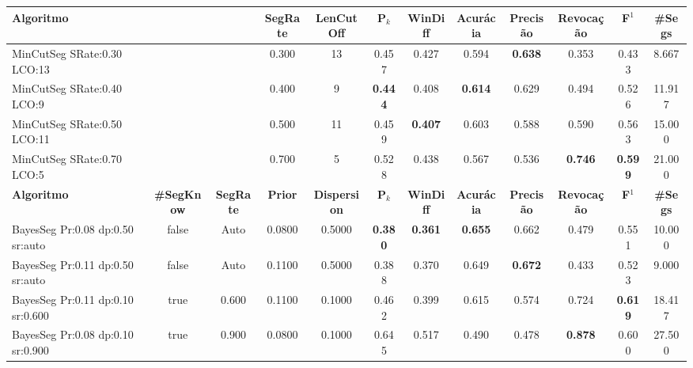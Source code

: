 \documentclass{article}
\begin{document}
\begin{table}[!h]
\begin{tabular}{|l||c|c|c|c|c|c|c|c|c|c|c|}
\hline
		\textbf{Algoritmo} &&& 
		\textbf{SegRate} &
		\textbf{LenCutOff} & 
		\textbf{P$_k$} & 
		\textbf{WinDiff} & 
		\textbf{Acurácia} & 
		\textbf{Precisão} & 
		\textbf{Revocação} &
		\textbf{F$^1$} &
		\textbf{\#Segs} \\	\hline


 MinCutSeg SRate:0.30 LCO:13 &&& 0.300 & 13 & 0.457 & 0.427 & 0.594 & \cellcolor{gray!20} \textbf{0.638} & 0.353 & 0.433 & 8.667  \\ \hline 

 MinCutSeg SRate:0.40 LCO:9 &&& 0.400 & 9 & \cellcolor{gray!20} \textbf{0.444} & 0.408 & \cellcolor{gray!20} \textbf{0.614} & 0.629 & 0.494 & 0.526 & 11.917  \\ \hline 

 MinCutSeg SRate:0.50 LCO:11 &&& 0.500 & 11 & 0.459 & \cellcolor{gray!20} \textbf{0.407} & 0.603 & 0.588 & 0.590 & 0.563 & 15.000  \\ \hline 

 MinCutSeg SRate:0.70 LCO:5 &&& 0.700 & 5 & 0.528 & 0.438 & 0.567 & 0.536 & \cellcolor{gray!20} \textbf{0.746} & \cellcolor{gray!20} \textbf{0.599} & 21.000  \\ \hline 






\hline
		\textbf{Algoritmo} &
		\textbf{\#SegKnow}	&
		\textbf{SegRate}& 
		\textbf{Prior} &
		\textbf{Dispersion} & 
		\textbf{P$_k$} & 
		\textbf{WinDiff} & 
		\textbf{Acurácia} & 
		\textbf{Precisão} & 
		\textbf{Revocação} &
		\textbf{F$^1$} &
		\textbf{\#Segs} \\	\hline




 BayesSeg Pr:0.08 dp:0.50 sr:auto & false & Auto & 0.0800 & 0.5000 & \cellcolor{gray!20} \textbf{0.380} & \cellcolor{gray!20} \textbf{0.361} & \cellcolor{gray!20} \textbf{0.655} & 0.662 & 0.479 & 0.551 & 10.000  \\ \hline 

 BayesSeg Pr:0.11 dp:0.50 sr:auto & false & Auto & 0.1100 & 0.5000 & 0.388 & 0.370 & 0.649 & \cellcolor{gray!20} \textbf{0.672} & 0.433 & 0.523 & 9.000  \\ \hline 

 BayesSeg Pr:0.11 dp:0.10 sr:0.600 & true & 0.600 & 0.1100 & 0.1000 & 0.462 & 0.399 & 0.615 & 0.574 & 0.724 & \cellcolor{gray!20} \textbf{0.619} & 18.417  \\ \hline 



 BayesSeg Pr:0.08 dp:0.10 sr:0.900 & true & 0.900 & 0.0800 & 0.1000 & 0.645 & 0.517 & 0.490 & 0.478 & \cellcolor{gray!20} \textbf{0.878} & 0.600 & 27.500  \\ \hline 






\end{tabular}
\end{table}
\end{document}
